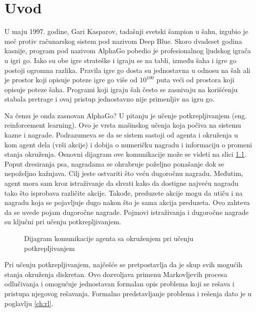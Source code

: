 \chapter{Uvod}



U maju 1997. godine, Gari Kasparov, tadašnji svetski šampion u šahu, izgubio je meč protiv računarskog sistem pod nazivom Deep Blue. Skoro dvadeset godina kasnije, program pod nazivom AlphaGo pobedio je profesionalnog ljudskog igrača u igri go. Iako su obe igre strateške i igraju se na tabli, između šaha i igre go postoji ogromna razlika. Pravila igre go dosta su jednostavna u odnosu na šah ali je prostor koji opisuje poteze igre go više od $10^{100}$ puta veći od prostora koji opisuje poteze šaha. Programi koji igraju šah često se zasnivaju na korišćenju stabala pretrage i ovaj pristup jednostavno nije primenljiv na igru go. \par

Na čemu je onda zasnovan AlphaGo? U pitanju je učenje potkrepljivanjem (eng. reinforcement learning). Ovo je vrsta mašinskog učenja koja počiva na sistemu kazne i nagrade. Podrazumeva se da se sistem sastoji od agenta i okruženja u kom agent dela (vrši akcije) i dobija o numeričku nagradu i informaciju o promeni stanja okruženja. Osnovni dijagram ove komunikacije može se videti na slici \ref{fig:rl_diag}. Poput dresiranja psa, nagradama se ohrabruje poželjno ponašanje dok se nepoželjno kažnjava. Cilj jeste ostvariti što veću dugoročnu nagradu. Međutim, agent mora sam kroz istraživanje da shvati kako da dostigne najveću nagradu tako što isprobava različite akcije. Takođe, preduzete akcije mogu da utiču i na nagradu koja se pojavljuje dugo nakon što je sama akcija preduzeta. Ovo zahteva da se uvede pojam dugoročne nagrade. Pojmovi istraživanja i dugoročne nagrade su ključni pri učenju potkrepljivanjem. 

\begin{figure}
	\centering
	\resizebox{.4\linewidth}{!}{}
	\caption{Dijagram komunikacije agenta sa okruženjem pri učenju potkrepljivanjem}
	\label{fig:rl_diag}
\end{figure}

\par
Pri učenju potkrepljivanjem, najčešće se pretpostavlja da je skup svih mogućih stanja okruženja diskretan. Ovo dozvoljava primenu Markovljevih procesa odlučivanja i omogućuje jednostavan formalan opis problema koji se rešava i pristupa njegovog rešavanja. Formalno predstavljanje problema i rešenja dato je u poglavlju \ref{ch:rl}.

